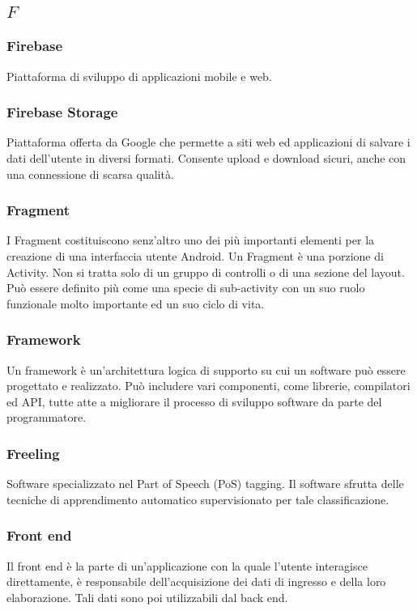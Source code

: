 \subsection*{\quad$F\quad$}
\subsubsection*{Firebase}
Piattaforma di sviluppo di applicazioni mobile e web.

\subsubsection*{Firebase Storage}
Piattaforma offerta da Google che permette a siti web ed applicazioni di salvare i dati dell'utente in diversi formati. Consente upload e download sicuri, anche con una connessione di scarsa qualità.

\subsubsection*{Fragment}
I Fragment costituiscono senz'altro uno dei più importanti elementi per la creazione di una interfaccia utente Android. Un Fragment è una porzione di Activity\glo. Non si tratta solo di un gruppo di controlli o di una sezione del layout. Può essere definito più come una specie di sub-activity con un suo ruolo funzionale molto importante ed un suo ciclo di vita. 

\subsubsection*{Framework}
Un framework è un'architettura logica di supporto su cui un software può essere progettato e realizzato. Può includere vari componenti, come librerie, compilatori ed API\glo, tutte atte a migliorare il processo di sviluppo software da parte del programmatore.

\subsubsection*{Freeling}
Software specializzato nel Part of Speech (PoS) tagging\glo. Il software sfrutta delle tecniche di apprendimento automatico supervisionato per tale classificazione.  

\subsubsection*{Front end}
Il front end è la parte di un'applicazione con la quale l'utente interagisce direttamente, è responsabile dell'acquisizione dei dati di ingresso e della loro elaborazione. Tali dati sono poi utilizzabili dal back end\glo. 


